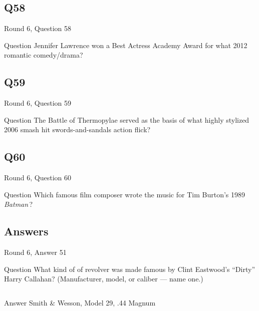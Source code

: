 \documentclass[11pt]{beamer}
\begin{document}
\subsection*{Q58}
\begin{frame}[t]{Round 6, Question 58}
\vspace{2em}
\begin{block}{Question}
Jennifer Lawrence won a Best Actress Academy Award for what 2012 romantic comedy/drama?
\end{block}
\end{frame}
    

\subsection*{Q59}
\begin{frame}[t]{Round 6, Question 59}
\vspace{2em}
\begin{block}{Question}
The Battle of Thermopylae served as the basis of what highly stylized 2006 smash hit swords-and-sandals action flick?
\end{block}
\end{frame}
    

\subsection*{Q60}
\begin{frame}[t]{Round 6, Question 60}
\vspace{2em}
\begin{block}{Question}
Which famous film composer wrote the music for Tim Burton's 1989 \emph{Batman}\,?
\end{block}
\end{frame}
    
\subsection{Answers}

\begin{frame}[t]{Round 6, Answer 51}
\vspace{2em}
\begin{block}{Question}
What kind of of revolver was made famous by Clint Eastwood's ``Dirty'' Harry Callahan? (Manufacturer, model, or caliber — name one.)
\end{block}
\pause{}
\begin{columns}[T,totalwidth=\linewidth]
\begin{column}{0.35\linewidth}
\begin{block}{Answer}
Smith \& Wesson, Model 29, .44 Magnum
\end{block}
\end{column}
\begin{column}{0.6\linewidth}
\begin{center}
\texttt{[image: \{Images/dirtyharry]}.jpg}
\end{center}
\end{column}
\end{columns}
\end{frame}
    
\end{document}
